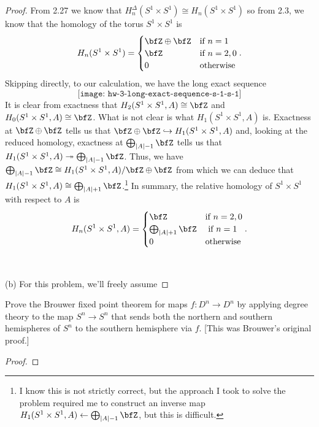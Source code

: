 \begin{proof}
From 2.27 we know that $H_n^\Delta(S^1\times S^1)\cong H_n(S^1\times S^1)$
so from 2.3, we know that the homology of the torus $S^1\times S^1$ is
\begin{equation}
\label{eq:homology-of-s-1-s-1}
H_n(S^1\times S^1)=
\begin{cases}
\bfZ\oplus\bfZ&\text{if $n=1$}\\
\bfZ&\text{if $n=2,0$}\\
0&\text{otherwise}
\end{cases}.
\end{equation}
Skipping directly, to our calculation, we have the long exact sequence
\begin{equation}
  \label{eq:long-exact-sequence-s-1-s-1}
\texttt{[image: hw-3-long-exact-sequence-s-1-s-1]}
\end{equation}
It is clear from exactness that $H_2(S^1\times S^1,A)\cong\bfZ$ and
$H_0(S^1\times S^1,A)\cong\bfZ$. What is not clear is what $H_1(S^1\times
S^1,A)$ is. Exactness at $\bfZ\oplus\bfZ$ tells us that
$\bfZ\oplus\bfZ\hookrightarrow H_1(S^1\times S^1,A)$ and, looking at the
reduced homology, exactness at $\bigoplus_{|A|-1}\bfZ$ tells us that
$H_1(S^1\times S^1,A)\twoheadrightarrow\bigoplus_{|A|-1}\bfZ$. Thus,
we have $\bigoplus_{|A|-1}\bfZ\cong H_1(S^1\times S^1,A)/\bfZ\oplus\bfZ$
from which we can deduce that $H_1(S^1\times
S^1,A)\cong\bigoplus_{|A|+1}\bfZ$.\footnote{I know this is not strictly
  correct, but the approach I took to solve the problem required me to
  construct an inverse map $H_1(S^1\times
  S^1,A)\leftarrow\bigoplus_{|A|-1}\bfZ$, but this is difficult.} In summary, the relative homology of
$S^1\times S^1$ with respect to $A$ is
\begin{equation}
  \label{eq:homology-of-s-1-s-1-a}
H_n(S^1\times S^1,A)=
\begin{cases}
\bfZ&\text{if $n=2,0$}\\
\bigoplus_{|A|+1}\bfZ&\text{ if $n=1$}\\
0&\text{otherwise}
\end{cases}.
\end{equation}
\\\\
(b) For this problem, we'll freely assume
\end{proof}
\newpage

\begin{problem}[Hatcher {\S}2.2, Ex.\@ 1]
Prove the Brouwer fixed point theorem for maps $f\colon D^n\to D^n$ by applying
degree theory to the map $S^n\to S^n$ that sends both the northern and
southern hemispheres of $S^n$ to the southern hemisphere via $f$. [This was
Brouwer’s original proof.]
\end{problem}
\begin{proof}
\end{proof}
\newpage

